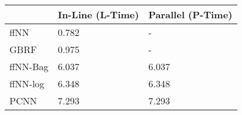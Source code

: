 \begin{tabular}{lll}
\toprule
{} & In-Line (L-Time) & Parallel (P-Time) \\
\midrule
ffNN     &            0.782 &                 - \\
GBRF     &            0.975 &                 - \\
ffNN-Bag &            6.037 &             6.037 \\
ffNN-log &            6.348 &             6.348 \\
PCNN     &            7.293 &             7.293 \\
\bottomrule
\end{tabular}
